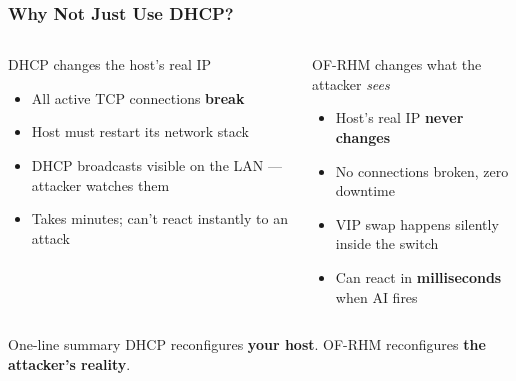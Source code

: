 \documentclass{beamer}
\begin{document}
\begin{frame}
\begin{center}
\end{center}

\end{frame}

\begin{frame}
\frametitle{Why Not Just Use DHCP?}

\begin{columns}

\begin{alertblock}{DHCP changes the host's real IP}
\begin{itemize}
  \item All active TCP connections \textbf{break}
  \item Host must restart its network stack
  \item DHCP broadcasts visible on the LAN --- attacker watches them
  \item Takes minutes; can't react instantly to an attack
\end{itemize}
\end{alertblock}

\begin{exampleblock}{OF-RHM changes what the attacker \textit{sees}}
\begin{itemize}
  \item Host's real IP \textbf{never changes}
  \item No connections broken, zero downtime
  \item VIP swap happens silently inside the switch
  \item Can react in \textbf{milliseconds} when AI fires
\end{itemize}
\end{exampleblock}

\end{columns}

\vspace{10pt}
\begin{block}{One-line summary}
DHCP reconfigures \textbf{your host}. \quad
OF-RHM reconfigures \textbf{the attacker's reality}.
\end{block}

\end{frame}
\end{document}
